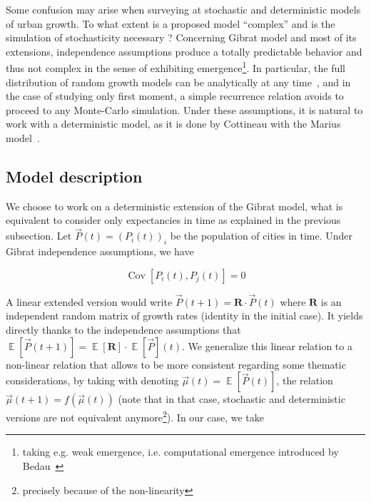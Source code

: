 \documentclass[Royal,sageh,times]{sagej}
\DeclareMathOperator{\Cov}{Cov}
\DeclareMathOperator{\E}{\mathbb{E}}
\newcommand{\Covb}[2]{\ensuremath{\Cov\!\left[#1,#2\right]}}
\newcommand{\Eb}[1]{\ensuremath{\E\!\left[#1\right]}}
\begin{document}


Some confusion may arise when surveying at stochastic and deterministic models of urban growth. To what extent is a proposed model ``complex'' and is the simulation of stochasticity necessary ? Concerning Gibrat model and most of its extensions, independence assumptions produce a totally predictable behavior and thus not complex in the sense of exhibiting emergence\footnote{taking e.g. weak emergence, i.e. computational emergence introduced by Bedau~\cite{}}. In particular, the full distribution of random growth models can be analytically at any time~\cite{}, and in the case of studying only first moment, a simple recurrence relation avoids to proceed to any Monte-Carlo simulation. Under these assumptions, it is natural to work with a deterministic model, as it is done by Cottineau with the Marius model~\cite{}.





\subsection*{Model description}

We choose to work on a deterministic extension of the Gibrat model, what is equivalent to consider only expectancies in time as explained in the previous subsection. Let $\vec{P}(t)=(P_i(t))_i$ be the population of cities in time. Under Gibrat independence assumptions, we have

\[
\Covb{P_i(t)}{P_j(t)}=0
\]

A linear extended version would write $\vec{P}(t+1)=\mathbf{R}\cdot \vec{P}(t)$ where $\mathbf{R}$ is an independent random matrix of growth rates (identity in the initial case). It yields directly thanks to the independence assumptions that $\Eb{\vec{P}(t+1)}=\Eb{\mathbf{R}}\cdot\Eb{\vec{P}}(t)$. We generalize this linear relation to a non-linear relation that allows to be more consistent regarding some thematic considerations, by taking with denoting $\vec{\mu}(t)=\Eb{\vec{P}(t)}$, the relation $\vec{\mu}(t+1)=f(\vec{\mu}(t))$ (note that in that case, stochastic and deterministic versions are not equivalent anymore\footnote{precisely because of the non-linearity %
}). 
In our case, we take
\end{document}
